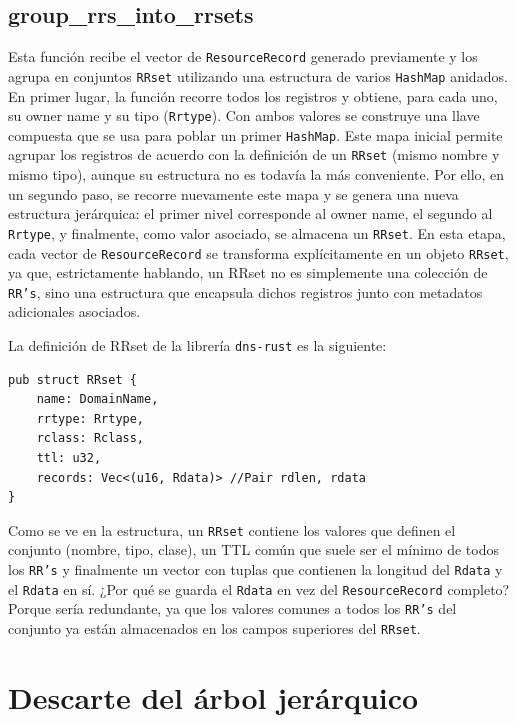 \subsection{group\_rrs\_into\_rrsets}
Esta función recibe el vector de \texttt{ResourceRecord} generado previamente y los agrupa en conjuntos \texttt{RRset} utilizando una estructura de varios \texttt{HashMap} anidados.
En primer lugar, la función recorre todos los registros y obtiene, para cada uno, su owner name y su tipo (\texttt{Rrtype}). Con ambos valores se construye una llave compuesta que se usa para poblar un 
primer \texttt{HashMap}. Este mapa inicial permite agrupar los registros de acuerdo con la definición de un \texttt{RRset} (mismo nombre y mismo tipo), aunque su estructura no es todavía la más conveniente.
Por ello, en un segundo paso, se recorre nuevamente este mapa y se genera una nueva estructura jerárquica: el primer nivel corresponde al owner name, el segundo al \texttt{Rrtype}, y finalmente, 
como valor asociado, se almacena un \texttt{RRset}. En esta etapa, cada vector de \texttt{ResourceRecord} se transforma explícitamente en un objeto \texttt{RRset}, ya que, estrictamente 
hablando, un RRset no es simplemente una colección de \texttt{RR's}, sino una estructura que encapsula dichos registros junto con metadatos adicionales asociados.

La definición de RRset de la librería \texttt{dns-rust} es la siguiente:\\

\begin{lstlisting}
pub struct RRset {
    name: DomainName,
    rrtype: Rrtype,
    rclass: Rclass,
    ttl: u32,
    records: Vec<(u16, Rdata)> //Pair rdlen, rdata
}
\end{lstlisting}

Como se ve en la estructura, un \texttt{RRset} contiene los valores que definen el conjunto (nombre, tipo, clase), un TTL común que suele ser el mínimo de todos los \texttt{RR's} y finalmente
un vector con tuplas que contienen la longitud del \texttt{Rdata} y el \texttt{Rdata} en sí. ¿Por qué se guarda el \texttt{Rdata} en vez del \texttt{ResourceRecord} completo? Porque sería redundante, 
ya que los valores comunes a todos los \texttt{RR's} del conjunto ya están almacenados en los campos superiores del \texttt{RRset}.


\section{Descarte del árbol jerárquico}\label{sec:descarte-arbol}

